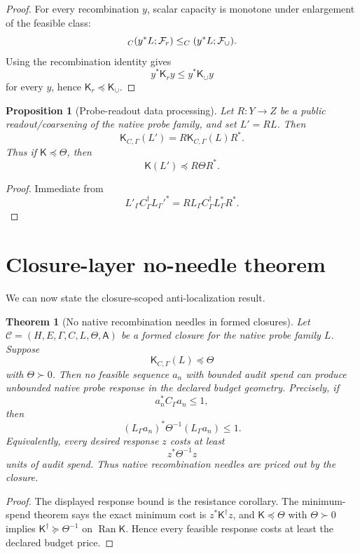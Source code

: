 \documentclass[11pt]{article}
\newtheorem{theorem}{Theorem}
\newtheorem{proposition}{Proposition}
\newcommand{\Ran}{\operatorname{Ran}}
\let\Cap\relax
\newcommand{\Cap}{\operatorname{Cap}}
\begin{document}
\begin{proof}
For every recombination $y$, scalar capacity is monotone under enlargement of the feasible class:
\[
        \Cap_C(y^*L;\mathcal F_r)\le\Cap_C(y^*L;\mathcal F_\cup).
\]
Using the recombination identity gives
\[
        y^*\mathsf K_r y\le y^*\mathsf K_\cup y
\]
for every $y$, hence $\mathsf K_r\preceq\mathsf K_\cup$.
\end{proof}

\begin{proposition}[Probe-readout data processing]
Let $R:Y\to Z$ be a public readout/coarsening of the native probe family, and set $L'=RL$.  Then
\[
        \boxed{\mathsf K_{C,\Gamma}(L')=R\mathsf K_{C,\Gamma}(L)R^*.}
\]
Thus if $\mathsf K\preceq\Theta$, then
\[
        \mathsf K(L')\preceq R\Theta R^*.
\]
\end{proposition}

\begin{proof}
Immediate from
\[
        L'_\Gamma C_\Gamma^\dagger L_\Gamma'^*
        =RL_\Gamma C_\Gamma^\dagger L_\Gamma^*R^*.
\]
\end{proof}

\section{Closure-layer no-needle theorem}
We can now state the closure-scoped anti-localization result.

\begin{theorem}[No native recombination needles in formed closures]
Let $\mathcal C=(H,E,\Gamma,C,L,\Theta,\mathsf A)$ be a formed closure for the native probe family $L$.  Suppose
\[
        \mathsf K_{C,\Gamma}(L)\preceq\Theta
\]
with $\Theta\succ0$.  Then no feasible sequence $a_n$ with bounded audit spend can produce unbounded native probe response in the declared budget geometry.  Precisely, if
\[
        a_n^*C_\Gamma a_n\le 1,
\]
then
\[
        (L_\Gamma a_n)^*\Theta^{-1}(L_\Gamma a_n)\le1.
\]
Equivalently, every desired response $z$ costs at least
\[
        z^*\Theta^{-1}z
\]
units of audit spend.  Thus native recombination needles are priced out by the closure.
\end{theorem}

\begin{proof}
The displayed response bound is the resistance corollary.  The minimum-spend theorem says the exact minimum cost is $z^*\mathsf K^\dagger z$, and $\mathsf K\preceq\Theta$ with $\Theta\succ0$ implies $\mathsf K^\dagger\succeq\Theta^{-1}$ on $\Ran\mathsf K$.  Hence every feasible response costs at least the declared budget price.
\end{proof}
\end{document}
